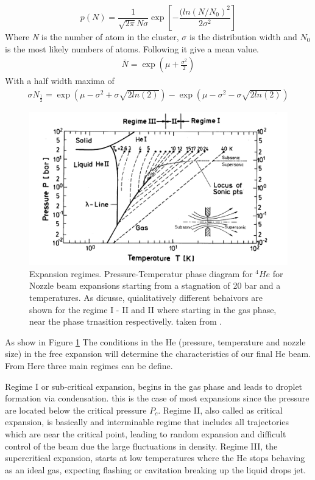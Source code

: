 \begin{equation}
p(N) = \frac{1}{\sqrt{2\pi}N \sigma} \exp  \left[- \frac{(ln(N/N_{0})^2}{2\sigma^2} \right]
\end{equation}
Where \textit{N} is the number of atom in the cluster, $\sigma$ is the distribution width and \textit{$N_{0}$} is the most likely numbers of atoms. Following it give a mean value.
\begin{align}
\bar N = \exp  \left(\mu+\frac{\sigma^2}{2} \right)
\end{align}
With a half width maxima of \cite{harms_density_1998}
\begin{align}
\sigma N_{\frac{1}{2}} = \exp \left( \mu - \sigma ^2 + \sigma \sqrt{2 ln(2)} \right) - \exp \left(  \mu - \sigma ^2 - \sigma \sqrt{2 ln(2)}  \right)
\end{align}

\begin{figure}[hbtp] \label{fig:ExpRegim}
\centering
\includegraphics[width= 8 cm]{../Images/expansion_regimes.PNG}
\caption[Phase diagram for Expantion regimens]{Expansion regimes. Pressure-Temperatur phase diagram for $^{4}He$ for Nozzle beam expansions starting from a stagnation of 20 bar and a temperatures. As dicusse, quialitatively different behaivors are shown for the regime I - II and II where  starting in the gas phase,  near the phase trnasition respectivelly. taken from \cite{buchenau_mass_1990}. }
\end{figure}

As show in Figure \ref{fig:ExpRegim} The conditions in the He (pressure, temperature and nozzle size) in the free expansion will determine the characteristics of our final He beam. From Here three main regimes can be define.

Regime I or sub-critical expansion, begins in the gas phase and leads to droplet formation via condensation. this is the case of most expansions since the pressure are located below the critical pressure $P_{c}$.
Regime II, also called as critical expansion, is basically  and interminable regime that includes all trajectories which are near the critical point, leading to random expansion and difficult control of the beam due the large fluctuations in density.
Regime III, the  supercritical expansion, starts at low temperatures where the He stops behaving as an ideal gas, expecting flashing or cavitation  breaking up the liquid drops jet. \cite{buchenau_mass_1990}

